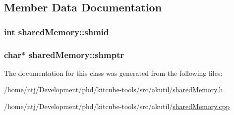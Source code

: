\subsection{Member Data Documentation}
\hypertarget{classsharedMemory_a741cd0f9856c5bd80816c33ba5b2dfd1}{
\subsubsection[{shmid}]{\setlength{\rightskip}{0pt plus 5cm}int shared\-Memory\-::shmid\hspace{0.3cm}{\ttfamily [private]}}}\label{classsharedMemory_a741cd0f9856c5bd80816c33ba5b2dfd1}
\hypertarget{classsharedMemory_a1b2da23cac3ca9446c82063a278cc805}{
\subsubsection[{shmptr}]{\setlength{\rightskip}{0pt plus 5cm}char$\ast$ shared\-Memory\-::shmptr\hspace{0.3cm}{\ttfamily [private]}}}\label{classsharedMemory_a1b2da23cac3ca9446c82063a278cc805}


The documentation for this class was generated from the following files\-:\begin{DoxyCompactItemize}
\item 
/home/ntj/\-Development/phd/kitcube-\/tools/src/akutil/\hyperlink{sharedMemory_8h}{shared\-Memory.\-h}\item 
/home/ntj/\-Development/phd/kitcube-\/tools/src/akutil/\hyperlink{sharedMemory_8cpp}{shared\-Memory.\-cpp}\end{DoxyCompactItemize}
